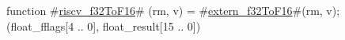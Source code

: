 function #\hyperref[sailRISCVzriscvzyf32ToF16]{riscv\_f32ToF16}# (rm, v) = {
  #\hyperref[sailRISCVzexternzyf32ToF16]{extern\_f32ToF16}#(rm, v);
  (float_fflags[4 .. 0], float_result[15 .. 0])
}

